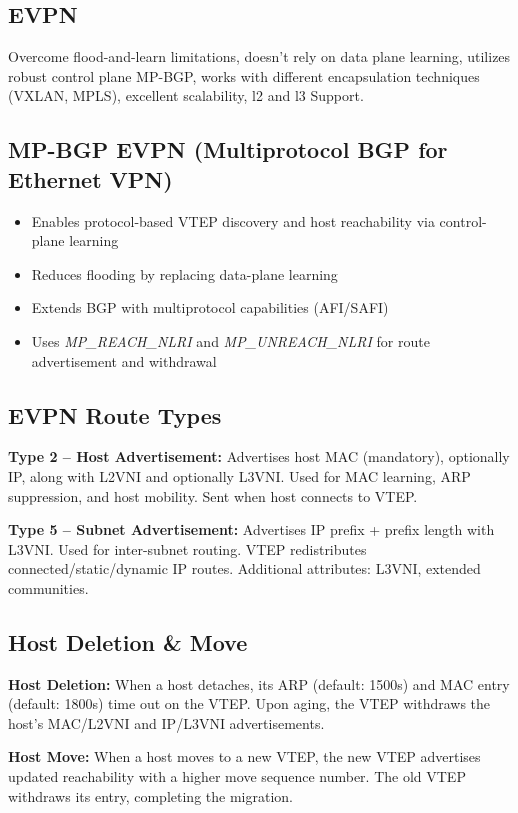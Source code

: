 \begin{multicols*}{5}
		\section{EVPN}
		Overcome flood-and-learn limitations, doesn't rely on data plane learning, utilizes robust control plane MP-BGP, works with different encapsulation techniques (VXLAN, MPLS), excellent scalability, l2 and l3 Support.
		
		\subsection{MP-BGP EVPN (Multiprotocol BGP for Ethernet VPN)}
		\begin{itemize}
			\item Enables protocol-based VTEP discovery and host reachability via control-plane learning
			\item Reduces flooding by replacing data-plane learning
			\item Extends BGP with multiprotocol capabilities (AFI/SAFI)
			\item Uses \textit{MP\_REACH\_NLRI} and \textit{MP\_UNREACH\_NLRI} for route advertisement and withdrawal
		\end{itemize}
		
		\subsection{EVPN Route Types}
		
		\textbf{Type 2 – Host Advertisement:} Advertises host MAC (mandatory), optionally IP, along with L2VNI and optionally L3VNI. Used for MAC learning, ARP suppression, and host mobility. Sent when host connects to VTEP.
		
		\textbf{Type 5 – Subnet Advertisement:} Advertises IP prefix + prefix length with L3VNI. Used for inter-subnet routing. VTEP redistributes connected/static/dynamic IP routes. Additional attributes: L3VNI, extended communities.
		
		\subsection{Host Deletion \& Move}
		
		\textbf{Host Deletion:} When a host detaches, its ARP (default: 1500s) and MAC entry (default: 1800s) time out on the VTEP. Upon aging, the VTEP withdraws the host’s MAC/L2VNI and IP/L3VNI advertisements.
		
		\textbf{Host Move:} When a host moves to a new VTEP, the new VTEP advertises updated reachability with a higher move sequence number. The old VTEP withdraws its entry, completing the migration.
		

\end{multicols*}
